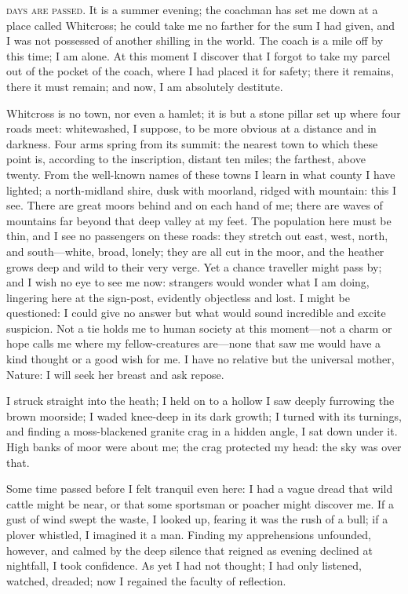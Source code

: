
 \textsc{days are passed.} It is a summer evening; the coachman has set me
down at a place called Whitcross; he could take me no farther for the
sum I had given, and I was not possessed of another shilling in the
world. The coach is a mile off by this time; I am alone. At this
moment I discover that I forgot to take my parcel out of the pocket of
the coach, where I had placed it for safety; there it remains, there it
must remain; and now, I am absolutely destitute.

Whitcross is no town, nor even a hamlet; it is but a stone pillar set up
where four roads meet: whitewashed, I suppose, to be more obvious at a
distance and in darkness. Four arms spring from its summit: the nearest
town to which these point is, according to the inscription, distant ten
miles; the farthest, above twenty. From the well-known names of these
towns I learn in what county I have lighted; a north-midland shire, dusk
with moorland, ridged with mountain: this I see. There are great moors
behind and on each hand of me; there are waves of mountains far beyond
that deep valley at my feet. The population here must be thin, and I
see no passengers on these roads: they stretch out east, west, north,
and south---white, broad, lonely; they are all cut in the moor, and the
heather grows deep and wild to their very verge. Yet a chance traveller
might pass by; and I wish no eye to see me now: strangers would wonder
what I am doing, lingering here at the sign-post, evidently objectless
and lost. I might be questioned: I could give no answer but what would
sound incredible and excite suspicion. Not a tie holds me to human
society at this moment---not a charm or hope calls me where my
fellow-creatures are---none that saw me would have a kind thought or a
good wish for me. I have no relative but the universal mother, Nature:
I will seek her breast and ask repose.

I struck straight into the heath; I held on to a hollow I saw deeply
furrowing the brown moorside; I waded knee-deep in its dark growth; I
turned with its turnings, and finding a moss-blackened granite crag in a
hidden angle, I sat down under it. High banks of moor were about me;
the crag protected my head: the sky was over that.

Some time passed before I felt tranquil even here: I had a vague dread
that wild cattle might be near, or that some sportsman or poacher might
discover me. If a gust of wind swept the waste, I looked up, fearing it
was the rush of a bull; if a plover whistled, I imagined it a man. 
Finding my apprehensions unfounded, however, and calmed by the deep
silence that reigned as evening declined at nightfall, I took
confidence. As yet I had not thought; I had only listened, watched,
dreaded; now I regained the faculty of reflection.

